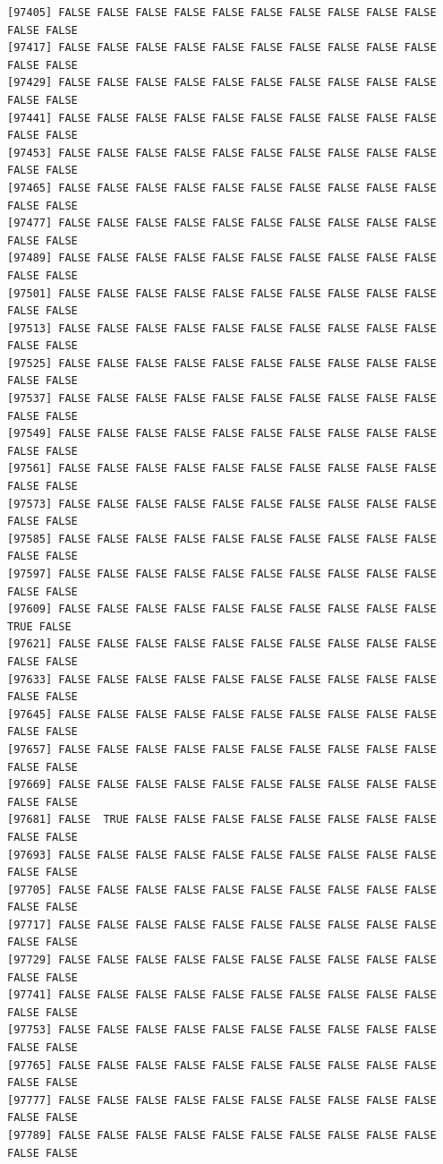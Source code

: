 \documentclass[
  a4paper,
  DIV=11,
  numbers=noendperiod]{scrartcl}
\begin{document}
\begin{verbatim}
[97405] FALSE FALSE FALSE FALSE FALSE FALSE FALSE FALSE FALSE FALSE FALSE FALSE
[97417] FALSE FALSE FALSE FALSE FALSE FALSE FALSE FALSE FALSE FALSE FALSE FALSE
[97429] FALSE FALSE FALSE FALSE FALSE FALSE FALSE FALSE FALSE FALSE FALSE FALSE
[97441] FALSE FALSE FALSE FALSE FALSE FALSE FALSE FALSE FALSE FALSE FALSE FALSE
[97453] FALSE FALSE FALSE FALSE FALSE FALSE FALSE FALSE FALSE FALSE FALSE FALSE
[97465] FALSE FALSE FALSE FALSE FALSE FALSE FALSE FALSE FALSE FALSE FALSE FALSE
[97477] FALSE FALSE FALSE FALSE FALSE FALSE FALSE FALSE FALSE FALSE FALSE FALSE
[97489] FALSE FALSE FALSE FALSE FALSE FALSE FALSE FALSE FALSE FALSE FALSE FALSE
[97501] FALSE FALSE FALSE FALSE FALSE FALSE FALSE FALSE FALSE FALSE FALSE FALSE
[97513] FALSE FALSE FALSE FALSE FALSE FALSE FALSE FALSE FALSE FALSE FALSE FALSE
[97525] FALSE FALSE FALSE FALSE FALSE FALSE FALSE FALSE FALSE FALSE FALSE FALSE
[97537] FALSE FALSE FALSE FALSE FALSE FALSE FALSE FALSE FALSE FALSE FALSE FALSE
[97549] FALSE FALSE FALSE FALSE FALSE FALSE FALSE FALSE FALSE FALSE FALSE FALSE
[97561] FALSE FALSE FALSE FALSE FALSE FALSE FALSE FALSE FALSE FALSE FALSE FALSE
[97573] FALSE FALSE FALSE FALSE FALSE FALSE FALSE FALSE FALSE FALSE FALSE FALSE
[97585] FALSE FALSE FALSE FALSE FALSE FALSE FALSE FALSE FALSE FALSE FALSE FALSE
[97597] FALSE FALSE FALSE FALSE FALSE FALSE FALSE FALSE FALSE FALSE FALSE FALSE
[97609] FALSE FALSE FALSE FALSE FALSE FALSE FALSE FALSE FALSE FALSE  TRUE FALSE
[97621] FALSE FALSE FALSE FALSE FALSE FALSE FALSE FALSE FALSE FALSE FALSE FALSE
[97633] FALSE FALSE FALSE FALSE FALSE FALSE FALSE FALSE FALSE FALSE FALSE FALSE
[97645] FALSE FALSE FALSE FALSE FALSE FALSE FALSE FALSE FALSE FALSE FALSE FALSE
[97657] FALSE FALSE FALSE FALSE FALSE FALSE FALSE FALSE FALSE FALSE FALSE FALSE
[97669] FALSE FALSE FALSE FALSE FALSE FALSE FALSE FALSE FALSE FALSE FALSE FALSE
[97681] FALSE  TRUE FALSE FALSE FALSE FALSE FALSE FALSE FALSE FALSE FALSE FALSE
[97693] FALSE FALSE FALSE FALSE FALSE FALSE FALSE FALSE FALSE FALSE FALSE FALSE
[97705] FALSE FALSE FALSE FALSE FALSE FALSE FALSE FALSE FALSE FALSE FALSE FALSE
[97717] FALSE FALSE FALSE FALSE FALSE FALSE FALSE FALSE FALSE FALSE FALSE FALSE
[97729] FALSE FALSE FALSE FALSE FALSE FALSE FALSE FALSE FALSE FALSE FALSE FALSE
[97741] FALSE FALSE FALSE FALSE FALSE FALSE FALSE FALSE FALSE FALSE FALSE FALSE
[97753] FALSE FALSE FALSE FALSE FALSE FALSE FALSE FALSE FALSE FALSE FALSE FALSE
[97765] FALSE FALSE FALSE FALSE FALSE FALSE FALSE FALSE FALSE FALSE FALSE FALSE
[97777] FALSE FALSE FALSE FALSE FALSE FALSE FALSE FALSE FALSE FALSE FALSE FALSE
[97789] FALSE FALSE FALSE FALSE FALSE FALSE FALSE FALSE FALSE FALSE FALSE FALSE

\end{verbatim}
\end{document}
